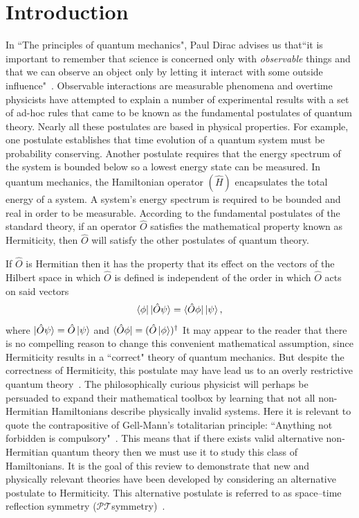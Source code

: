 \documentclass[12pt, a4paper]{report}
\newcommand\PT{\(\mathcal{PT}\)}
\begin{document}
\chapter{Introduction}\label{Introduction}
In ``The principles of quantum mechanics", Paul Dirac advises us that``it is important to remember that science is concerned only with \textit{observable} things and that we can observe an object only by letting it interact with some outside influence"~\cite{POQM}. Observable interactions are measurable phenomena and overtime physicists have attempted to explain a number of experimental results with a set of ad-hoc rules that came to be known as the fundamental postulates of quantum theory. Nearly all these postulates are based in physical properties. For example, one postulate establishes that time evolution of a quantum system must be probability conserving. Another postulate requires that the energy spectrum of the system is bounded below so a lowest energy state can be measured. In quantum mechanics, the Hamiltonian operator $(\hat{H})$ encapsulates the total energy of a system. A system's energy spectrum is required to be bounded and real in order to be measurable. According to the fundamental postulates of the standard theory, if an operator $\hat{O}$ satisfies the mathematical property known as Hermiticity, then $\hat{O}$ will satisfy the other postulates of quantum theory.

If $\hat{O}$ is Hermitian then it has the property that its effect on the vectors of the Hilbert space in which $\hat{O}$ is defined is independent of the order in which $\hat{O}$ acts on said vectors~\cite{Jones-Smith}
\begin{equation}\label{eq:1.1}
\bra{\phi}\ket{\hat{O}\psi} = \bra{\hat{O}\phi}\ket{\psi},
\end{equation}
where $\ket{\hat{O}\psi} = \hat{O}\ket{\psi}$ and $\bra{\hat{O}\phi} = (\hat{O}\ket{\phi})^{\dagger}$
It may appear to the reader that there is no compelling reason to change this convenient mathematical assumption, since Hermiticity results in a ``correct" theory of quantum mechanics. But despite the correctness of Hermiticity, this postulate may have lead us to an overly restrictive quantum theory~\cite{MustaHbeHermitian}. The philosophically curious physicist will perhaps be persuaded to expand their mathematical toolbox by learning that not all non-Hermitian Hamiltonians describe physically invalid systems. Here it is relevant to quote the contrapositive of Gell-Mann's totalitarian principle: ``Anything not forbidden is compulsory"~\cite{MGM}. This means that if there exists valid alternative non-Hermitian quantum theory then we must use it to study this class of Hamiltonians.
It is the goal of this review to demonstrate that new and physically relevant theories have been developed by considering an alternative postulate to Hermiticity. This alternative postulate is referred to as space–time reflection symmetry (\PT\:symmetry)~\cite{MustaHbeHermitian}. 
\end{document}

